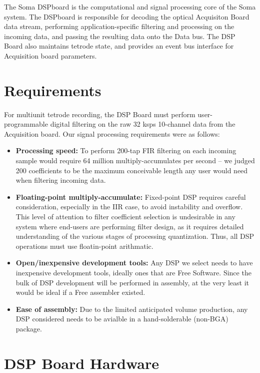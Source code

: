 \documentclass{article}
\begin{document}
The Soma DSPboard is the computational and signal processing core of
the Soma system. The DSPboard is responsible for decoding the optical
Acquisiton Board data stream, performing application-specific
filtering and processing on the incoming data, and passing the
resulting data onto the Data bus. The DSP Board also maintains tetrode
state, and provides an event bus interface for Acquisition board
parameters.

\section{Requirements}
For multiunit tetrode recording, the DSP Board must perform
user-programmable digital filtering on the raw 32 ksps 10-channel data
from the Acquisition board. Our signal processing requirements were as
follows:
    
\begin{itemize}
\item \textbf{Processing speed:} To perform 200-tap FIR filtering on each
  incoming sample would require 64 million multiply-accumulates per
  second -- we judged 200 coefficients to be the maximum conceivable
  length any user would need when filtering incoming data.
  
\item \textbf{Floating-point multiply-accumulate:} Fixed-point DSP requires
  careful consideration, especially in the IIR case, to avoid
  instability and overflow. This level of attention to filter
  coefficient selection is undesirable in any system where end-users
  are performing filter design, as it requires detailed understanding
  of the various stages of processing quantization. Thus, all DSP
  operations must use floatin-point arithmatic.
  
\item \textbf{Open/inexpensive development tools:} Any DSP we select needs to
  have inexpensive development tools, ideally ones that are Free
  Software. Since the bulk of DSP development will be performed in
  assembly, at the very least it would be ideal if a Free assembler
  existed.
  
\item \textbf{Ease of assembly:} Due to the limited anticipated volume
  production, any DSP considered needs to be avialble in a
  hand-solderable (non-BGA) package.
\end{itemize}

\section{DSP Board Hardware}
      
\end{document}

